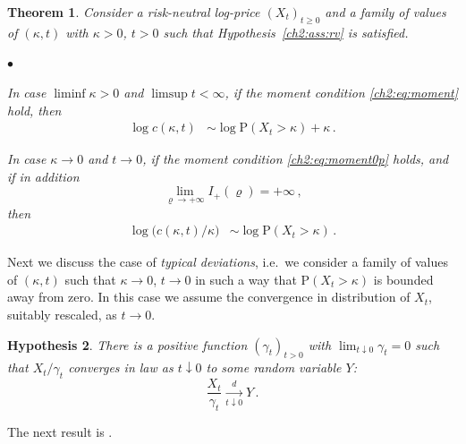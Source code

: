 \documentclass[a4paper,reqno,11pt]{amsart}
\numberwithin{equation}{section}
\newtheorem{theorem}{Theorem}[section]
\newtheorem{hypothesis}[theorem]{Hypothesis}
\newcommand{\PEfont}{\mathrm}
\renewcommand{\P}{\ensuremath{\PEfont P}}
\renewcommand{\rho}{\varrho}
\newenvironment{myitemize}{%
\begin{list}{$\bullet$}%
 	{%
	\setlength{\itemsep}{0.4em}%
	\setlength{\topsep}{0.5em}%
	\setlength\leftmargin{2.45em}%
	\setlength\labelwidth{2.05em}%
	\setlength{\labelsep}{0.4em}%
	}%
	}%
{\end{list}}
\renewenvironment{itemize}{
\begin{myitemize}}%
{\end{myitemize}}
\begin{document}
\begin{theorem}\label{ch2:th:main2b}
Consider a risk-neutral log-price $(X_t)_{t\ge 0}$ and a
family of values of $(\kappa,t)$ with $\kappa > 0$, $t > 0$ such that
Hypothesis~\ref{ch2:ass:rv} is satisfied.
\begin{itemize}
\item In case $\liminf\kappa > 0$ and $\limsup t < \infty$,
if the moment condition \eqref{ch2:eq:moment} hold, then
\begin{equation}\label{ch2:eq:ma1c}
\begin{split}
	\log c(\kappa,t) & \sim  \log \P(X_t > \kappa) + \kappa \,.
\end{split}
\end{equation}

\item In case $\kappa \to 0$ and $t \to 0$,
if the moment condition \eqref{ch2:eq:moment0p} holds, and if in addition
\begin{equation}\label{ch2:eq:Iplus}
 \lim_{\rho \to +\infty}I_{+}(\rho )=+\infty \,,
\end{equation}
then
\begin{align} \label{ch2:eq:ma2c}
	\log \big( c(\kappa,t) / \kappa \big) & \sim  \log \P(X_t > \kappa) \,.
\end{align}
\end{itemize}
\end{theorem}

Next we discuss the case of \emph{typical deviations},
i.e.\ we consider a family
of values of $(\kappa,t)$ such that $\kappa \to 0$, $t \to 0$
in such a way that $\P(X_t>\kappa)$ is bounded away from zero.
In this case we assume the convergence in distribution of $X_t$, suitably
rescaled, as $t \to 0$.

\begin{hypothesis} \label{ch2:ass:smalltime}
There is a positive function $(\gamma_t)_{t > 0}$ with
$\lim_{t\downarrow 0}\gamma_t = 0$ such
that $X_t / \gamma_t$ converges in law as $t \downarrow 0$ to
some random variable $Y$:
\begin{equation} \label{ch2:eq:scaling}
	\frac{X_t}{\gamma_t} \xrightarrow[t\downarrow 0]{d} Y \,.
\end{equation}
\end{hypothesis}

\noindent
The next result is \cite[Theorem 2.7]{cf:CC}.
\end{document}
